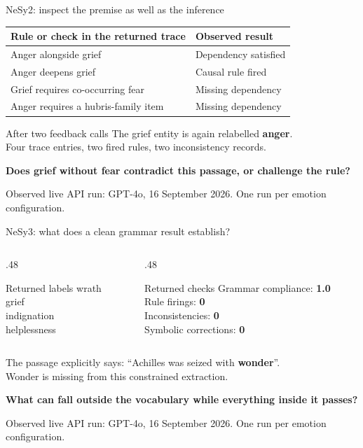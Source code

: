\documentclass[aspectratio=169,10pt]{beamer}
\newcommand{\key}[1]{\textcolor{aegean}{\textbf{#1}}}
\newcommand{\hl}[1]{\textcolor{terracotta}{\textbf{#1}}}
\newcommand{\source}[1]{\vfill{\scriptsize\color{slate}#1\par}}
\newcommand{\observed}{\source{Observed live API run: GPT-4o, 16 September 2026. One run per emotion configuration.}}
\newcommand{\question}[1]{\medskip\par\key{#1}\par}
\begin{document}
\begin{frame}{NeSy2: inspect the premise as well as the inference}
  \small
  \begin{tabularx}{\textwidth}{@{}Xl@{}}
    \toprule
    \textbf{Rule or check in the returned trace} & \textbf{Observed result}\\
    \midrule
    Anger alongside grief & Dependency satisfied\\[5pt]
    Anger deepens grief & Causal rule fired\\[5pt]
    Grief requires co-occurring fear & Missing dependency\\[5pt]
    Anger requires a hubris-family item & Missing dependency\\
    \bottomrule
  \end{tabularx}
  \medskip
  \begin{block}{After two feedback calls}
    The grief entity is again relabelled \hl{anger}.\\
    Four trace entries, two fired rules, two inconsistency records.
  \end{block}
  \question{Does grief without fear contradict this passage, or challenge the rule?}
  \observed
\end{frame}

\begin{frame}{NeSy3: what does a clean grammar result establish?}
  \begin{columns}[T]
    \begin{column}{.48\textwidth}
      \begin{block}{Returned labels}
        wrath\\
        grief\\
        indignation\\
        helplessness
      \end{block}
    \end{column}
    \begin{column}{.48\textwidth}
      \begin{block}{Returned checks}
        Grammar compliance: \key{1.0}\\
        Rule firings: \key{0}\\
        Inconsistencies: \key{0}\\
        Symbolic corrections: \key{0}
      \end{block}
    \end{column}
  \end{columns}
  \medskip
  The passage explicitly says: “Achilles was seized with \hl{wonder}”.\\
  Wonder is missing from this constrained extraction.
  \question{What can fall outside the vocabulary while everything inside it passes?}
  \observed
\end{frame}
\end{document}
